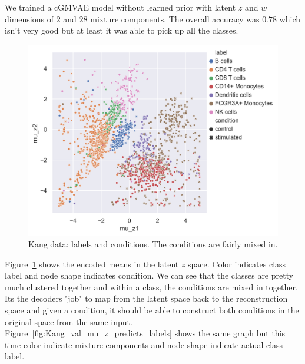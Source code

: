 \documentclass[11pt, a4paper]{report}
\theoremstyle{plain}
\theoremstyle{definition}
\theoremstyle{remark}
\begin{document}
We trained a cGMVAE model without learned prior with latent $z$ and $w$ dimensions of $2$ and $28$
mixture components.
The overall accuracy was $0.78$ which isn't very good but at least
it was able to pick up all the classes.

\begin{figure}[h]
\centering
\includegraphics[width=1.10\textwidth]{images/Kang_val_mu_z_labels.png}
\caption{Kang data: labels and conditions. The conditions are fairly mixed in.}
\label{fig:Kang_val_mu_z_labels}
\end{figure}

Figure~\ref{fig:Kang_val_mu_z_labels} shows the encoded means in the latent $z$
space. Color indicates class label and node shape indicates condition.
We can see that the classes are pretty much clustered together and within a
class, the conditions are mixed in together. Its the decoders "job" to map from
the latent space back to the reconstruction space and given a condition, it
should be able to construct both conditions in the original space from the same
input. Figure~\ref{fig:Kang_val_mu_z_predicts_labels} shows the same graph but
this time color indicate mixture components and node shape indicate actual class
label.
\end{document}
